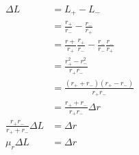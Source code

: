 \begin{eqnarray}\label{eqn:net-likelihood}
\Delta L & = L_+ - L_- \\
& = \frac{r_+}{r_-} - \frac{r_-}{r_+} \\
& =  \frac{r+}{r_+}\frac{r_+}{r_-} - \frac{r_-}{r_-}\frac{r_-}{r_+} \\
& =  \frac{r_+^2 - r_-^2}{r_+r_-} \\
& =  \frac{(r_+ + r_-)(r_+ - r_-)}{r_+r_-} \\
& =  \frac{r_+ + r_-}{r_+r_-}\Delta r \\
\frac{r_+r_-}{r_+ + r_-}\Delta L &= \Delta r \\
\mu_r\Delta L &= \Delta r
\end{eqnarray}